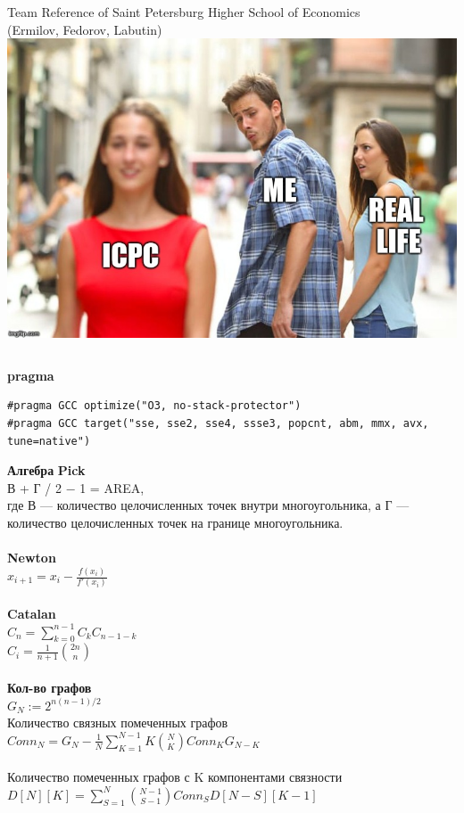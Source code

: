 \documentclass[a4paper,10pt, twocolumn]{article}
\begin{document}
\onecolumn
{}
\vspace*{\fill}
\begin{center}{ \Large Team Reference of Saint Petersburg Higher School of Economics\\ (Ermilov, Fedorov, Labutin)\\
		\vspace{0.5cm} \includegraphics[width=0.8\linewidth]{meme.jpg}} 
\end{center}
\vspace*{\fill}
\pagebreak \twocolumn
\inputminted[linenos, breaklines]{c++}{code/pollard.cpp}
\pagebreak
\textbf{pragma}
\begin{verbatim}
#pragma GCC optimize("O3, no-stack-protector")
#pragma GCC target("sse, sse2, sse4, ssse3, popcnt, abm, mmx, avx, tune=native")
\end{verbatim}

\textbf{Алгебра} 
{\bf Pick}\\
В + Г / 2 − 1 = AREA,\\
где В — количество целочисленных точек внутри многоугольника, а Г — количество целочисленных точек на границе многоугольника.\\\\

{\bf Newton}\\
$x_{i+1}=x_i-\frac {f(x_i)} {f'(x_i)}$\\\\

{\bf Catalan}\\
$C_n=\sum\limits_{k=0}^{n-1} C_{k} C_{n-1-k}$\\
$C_i=\frac 1 {n + 1} \binom {2n} {n}$\\\\

{\bf Кол-во графов}\\
$G_N:=2^{n(n-1)/2}$\\
Количество связных помеченных графов\\
$Conn_N = G_N - \frac 1 N \sum\limits_{K=1}^{N-1} K \binom N K Conn_K G_{N-K}$\\\\
Количество помеченных графов с K компонентами связности\\
$D[N][K]=\sum\limits_{S=1}^N \binom {N-1} {S-1} Conn_S D[N-S][K-1]$\\\\
\end{document}
